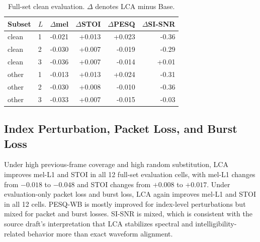 \documentclass[10pt,twocolumn]{article}
\begin{document}
\begin{table}[t]
\centering
\caption{Full-set clean evaluation. \(\Delta\) denotes LCA minus Base.}
\label{tab:clean_full}
\small
\begin{tabular}{llrrrr}
\toprule
Subset & \(L\) & \(\Delta\)mel & \(\Delta\)STOI & \(\Delta\)PESQ & \(\Delta\)SI-SNR \\
\midrule
clean & 1 & -0.021 & +0.013 & +0.023 & -0.36 \\
clean & 2 & -0.030 & +0.007 & -0.019 & -0.29 \\
clean & 3 & -0.036 & +0.007 & -0.014 & +0.01 \\
other & 1 & -0.013 & +0.013 & +0.024 & -0.31 \\
other & 2 & -0.030 & +0.008 & -0.010 & -0.36 \\
other & 3 & -0.033 & +0.007 & -0.015 & -0.03 \\
\bottomrule
\end{tabular}
\end{table}

\subsection{Index Perturbation, Packet Loss, and Burst Loss}

Under high previous-frame coverage and high random substitution, LCA improves mel-L1 and STOI in all 12 full-set evaluation cells, with mel-L1 changes from \(-0.018\) to \(-0.048\) and STOI changes from \(+0.008\) to \(+0.017\). Under evaluation-only packet loss and burst loss, LCA again improves mel-L1 and STOI in all 12 cells. PESQ-WB is mostly improved for index-level perturbations but mixed for packet and burst losses. SI-SNR is mixed, which is consistent with the source draft's interpretation that LCA stabilizes spectral and intelligibility-related behavior more than exact waveform alignment.
\end{document}
